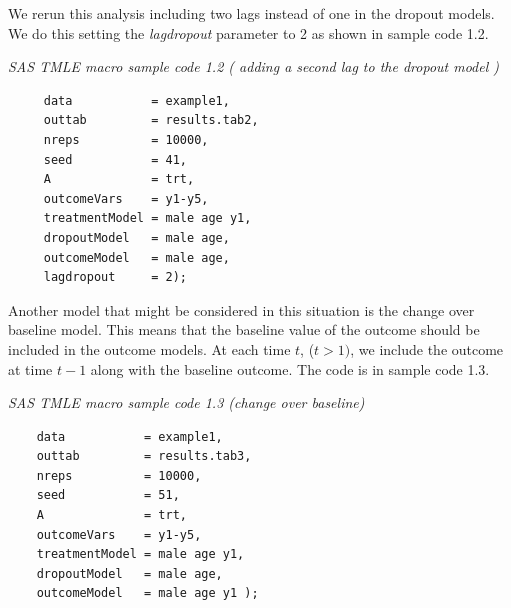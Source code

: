 \documentclass[10pt]{article}
\renewcommand{\baselinestretch}{1.3}
\begin{document}

\newpage
We rerun this analysis including two lags instead of one in the dropout models.  We do this setting the {\em lagdropout} parameter to 2 as shown in sample code 1.2.
\vspace{0.1in}

\begin{minipage}{\textwidth}
\renewcommand{\baselinestretch}{1.0}\selectfont%
\begin{minipage}[l]{5.6in}
\normalsize\em%
SAS TMLE macro sample code 1.2 ( adding a second lag to the dropout model )
\end{minipage}\vspace{-0.08in}
\begin{Verbatim}[baselinestretch=1.0, fontsize=\small, frame=single, commandchars=\\\{\}]
 %tmle(
     data           = example1,
     outtab         = results.tab2,
     nreps          = 10000,
     seed           = 41,
     A              = trt,
     outcomeVars    = y1-y5,
     treatmentModel = male age y1,
     dropoutModel   = male age,
     outcomeModel   = male age,
     lagdropout     = 2);  
\end{Verbatim}
\end{minipage}
\vspace{0.2in}


\newpage
Another model that might be considered in this situation is the change over baseline model.  This means that the baseline value of the outcome should be included in the outcome models. At each time $t$, ($t > 1)$, we include  the outcome at time $t-1$ along with the baseline outcome.  The code is in sample code 1.3.

\vspace{0.1in}


\begin{minipage}{\textwidth}
\renewcommand{\baselinestretch}{1.0}\selectfont%
\begin{minipage}[l]{5.6in}
\normalsize\em%
SAS TMLE macro sample code 1.3 (change over baseline)
\end{minipage}\vspace{-0.08in}
\begin{Verbatim}[baselinestretch=1.0, fontsize=\small, frame=single, commandchars=\\\{\}]
  %tmle(
    data           = example1,
    outtab         = results.tab3,
    nreps          = 10000,
    seed           = 51,
    A              = trt,
    outcomeVars    = y1-y5,
    treatmentModel = male age y1,
    dropoutModel   = male age,
    outcomeModel   = male age y1 );
\end{Verbatim}
\end{minipage}
\vspace{0.2in}
\end{document}
